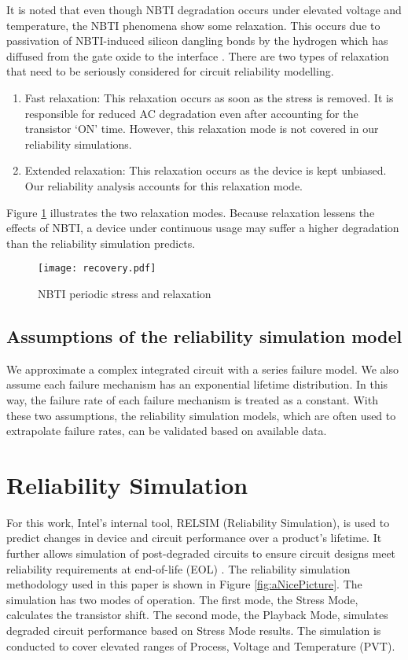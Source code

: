 \documentclass[11pt,a4paper]{article}
\begin{document}
It is noted that even though NBTI degradation occurs under elevated voltage and temperature, the NBTI phenomena show some relaxation. This occurs due to passivation of NBTI-induced silicon dangling bonds by the hydrogen which has diffused from the gate oxide to the interface \cite{Kufluoglu}. There are two types of relaxation that need to be seriously considered for circuit reliability modelling.

\begin{enumerate}
\item Fast relaxation: This relaxation occurs as soon as the stress is removed. It is responsible for reduced AC degradation even after accounting for the transistor `ON' time. However, this relaxation mode is not covered in our reliability simulations.
\item Extended relaxation: This relaxation occurs as the device is kept unbiased. Our reliability analysis accounts  for this relaxation mode.


\end{enumerate}
Figure \ref{figure 12} illustrates the two relaxation modes.
Because relaxation lessens the effects of NBTI, a device under continuous usage may suffer a higher degradation than  the reliability simulation predicts. 
\begin{figure}[t]
\centering
\texttt{[image: recovery.pdf]}
\caption{NBTI periodic stress and relaxation}
\label{figure 12}
\end{figure}


\subsection{Assumptions of the reliability simulation model}
We  approximate a complex integrated circuit with a  series failure model. 
We also assume each failure mechanism
has an exponential lifetime distribution. In this way, the failure rate of each failure mechanism is treated as a constant. With these two assumptions, the reliability simulation models, which are often used to extrapolate failure rates, can be validated based on available data. 


\section{Reliability Simulation}
For this work,  Intel's internal tool, RELSIM (Reliability Simulation), is used to predict changes in device and circuit performance over a product's lifetime. It further allows simulation of post-degraded circuits to ensure circuit designs meet reliability requirements at end-of-life (EOL) \cite{Latif}. The reliability simulation methodology used in this paper is shown in Figure \ref{fig:aNicePicture}. The simulation has two modes of operation. The first mode, the Stress Mode, calculates the transistor  shift. The second mode, the Playback Mode, simulates degraded circuit performance based on Stress Mode results. The simulation is conducted to cover elevated ranges of Process, Voltage and Temperature (PVT). 
\end{document}
